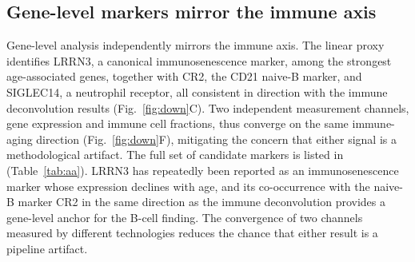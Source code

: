 \documentclass[11pt,a4paper]{article}
\begin{document}
\subsection{Gene-level markers mirror the immune axis}\label{sec:res6}
Gene-level analysis independently mirrors the immune axis. The linear proxy identifies LRRN3, a canonical immunosenescence marker, among the strongest age-associated genes, together with CR2, the CD21 naive-B marker, and SIGLEC14, a neutrophil receptor, all consistent in direction with the immune deconvolution results (Fig.~\ref{fig:down}C). Two independent measurement channels, gene expression and immune cell fractions, thus converge on the same immune-aging direction (Fig.~\ref{fig:down}F), mitigating the concern that either signal is a methodological artifact. The full set of candidate markers is listed in (Table~\ref{tab:aa}). LRRN3 has repeatedly been reported as an immunosenescence marker whose expression declines with age, and its co-occurrence with the naive-B marker CR2 in the same direction as the immune deconvolution provides a gene-level anchor for the B-cell finding. The convergence of two channels measured by different technologies reduces the chance that either result is a pipeline artifact.
\end{document}

